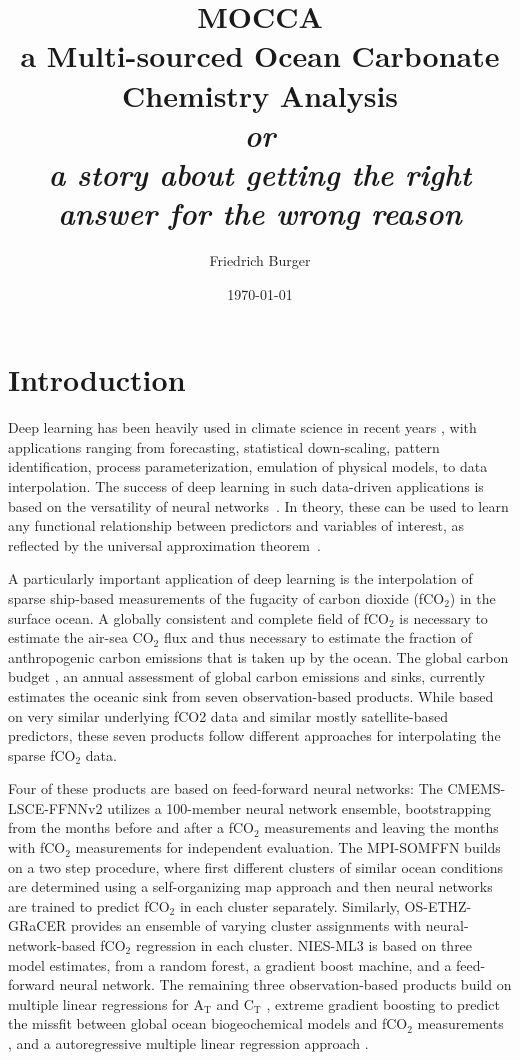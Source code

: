 \documentclass{article}
\title{\textbf{MOCCA} \\[0.25cm]
\large a Multi-sourced Ocean Carbonate Chemistry Analysis \\[1cm]
\textit{or} \\[0.25cm]
\textit{a story about getting the right answer for the wrong reason}}
\author{Friedrich Burger}
\date{\today}
\begin{document}
	
	\maketitle
	
	\newpage
	
	\tableofcontents
	\section{Introduction}
	Deep learning has been heavily used in climate science in recent years \citep{reichstein2019}, with applications ranging from forecasting, statistical down-scaling, pattern identification, process parameterization, emulation of physical models, to data interpolation. The success of deep learning in such data-driven applications is based on the versatility of neural networks~\cite{goodfellow2016}. In theory, these can be used to learn any functional relationship between predictors and variables of interest, as reflected by the universal approximation theorem~\cite{hornik1989}.
	
	A particularly important application of deep learning is the interpolation of sparse ship-based measurements of the fugacity of carbon dioxide (fCO$_2$) in the surface ocean. A globally consistent and complete field of fCO$_2$ is necessary to estimate the air-sea CO$_2$ flux and thus necessary to estimate the fraction of anthropogenic carbon emissions that is taken up by the ocean. The global carbon budget \citep{friedlingstein2023}, an annual assessment of global carbon emissions and sinks, currently estimates the oceanic sink from seven observation-based products. While based on very similar underlying fCO2 data and similar mostly satellite-based predictors, these seven products follow different approaches for interpolating the sparse fCO$_2$ data. 
	
	Four of these products are based on feed-forward neural networks: The CMEMS-LSCE-FFNNv2 \citep{chau2022} utilizes a 100-member neural network ensemble,  bootstrapping from the months before and after a fCO$_2$ measurements and leaving the months with fCO$_2$ measurements for independent evaluation. The MPI-SOMFFN \citep{landschuetzer2016} builds on a two step procedure, where first different clusters of similar ocean conditions are determined using a self-organizing map approach and then neural networks are trained to predict fCO$_2$ in each cluster separately. Similarly, OS-ETHZ-GRaCER \citep{gregor2021} provides an ensemble of varying cluster assignments with neural-network-based fCO$_2$ regression in each cluster. NIES-ML3 \citep{zeng2022} is based on three model estimates, from a random forest, a gradient boost machine, and a feed-forward neural network. The remaining three observation-based products build on multiple linear regressions for A$_\text{T}$ and C$_\text{T}$ \citep[fundamental variables to calculate fCO$_2$ and other carbonate system variables; JMA-MLR;][]{iida2021}, extreme gradient boosting to predict the missfit between global ocean biogeochemical models and fCO$_2$ measurements \citep[LDEO-HPD;][]{gloege2022}, and a autoregressive multiple linear regression approach \citep[Jena-MLS;][]{roedenbeck2022}.
	
\end{document}
